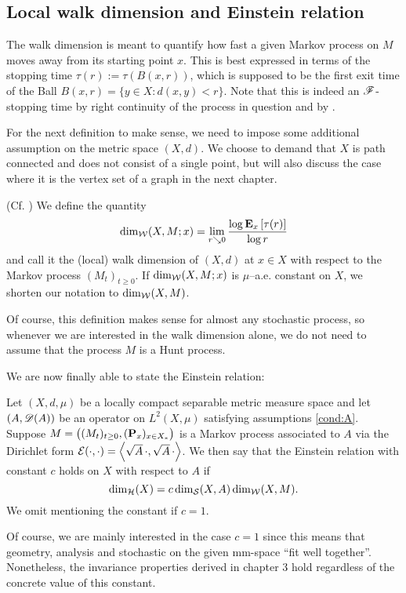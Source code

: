 \subsection{Local walk dimension and Einstein relation}

The walk dimension is meant to quantify how fast a given Markov process on $M$ moves away from its starting point $x$. This is best expressed in terms of the stopping time $\tau(r):=\tau(B(x,r))$, which is supposed to be the first exit time of the Ball $B(x,r)=\{y\in X:d(x,y)<r\}$. Note that this is indeed an $\scF$-stopping time by right continuity of the process in question and by \cite[Lemma 7.6]{kallenberg2002foundations}.

For the next definition to make sense, we need to impose some additional assumption on the metric space $(X,d)$. We choose to demand that $X$ is path connected and does not consist of a single point, but will also discuss the case where it is the vertex set of a graph in the next chapter. 
\begin{defin}\label{def:dimw}(Cf. \cite{hambly_kigami_kumagai_2002})
  We define the quantity
  \[
    \dimw(X,M;x)=\lim_{r\searrow0}\frac{\log \PTEp{\tau(r)}{x}}{\log r}
  \]
  and call it the (local) walk dimension of $(X,d)$ at $x\in X$ with respect to the Markov process $(M_t)_{t\geq0}$. If $\dimw(X,M;x)$ is $\mu$--a.e. constant on $X$, we shorten our notation to $\dimw(X,M)$.
\end{defin}
Of course, this definition makes sense for almost any stochastic process, so whenever we are interested in the walk dimension alone, we do not need to assume that the process $M$ is a Hunt process.

We are now finally able to state the Einstein relation: 
\begin{defin}\label{defin:ER}
  Let $(X,d,\mu)$ be a locally compact separable metric measure space and let $(A,\scD(A))$ be an operator on $L^2(X,\mu)$ satisfying assumptions \ref{cond:A}. Suppose $M=\big((M_t)_{t\geq0},(\Prob_x)_{x\in X_*}\big)$ is a Markov process associated to $A$ via the Dirichlet form $\cE(\cdot,\cdot)=\left<\sqrt{A}\,\cdot,\sqrt{A}\,\cdot\right>$. We then say that the Einstein relation with constant $c$ holds on $X$ with respect to $A$ if
  \begin{equation}\label{eq:ER}
    \dimh(X)=c\dims(X,A)\dimw(X,M).
  \end{equation}
  We omit mentioning the constant if $c=1$.
\end{defin}
Of course, we are mainly interested in the case $c=1$ since this means that geometry, analysis and stochastic on the given mm-space ``fit well together''. Nonetheless, the invariance properties derived in chapter 3 hold regardless of the concrete value of this constant.

